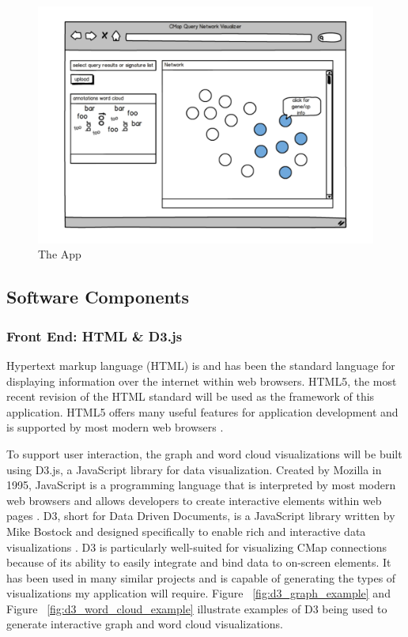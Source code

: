 \documentclass[12pt]{article}
\begin{document}
\begin{figure}[h]
\centering
\includegraphics[scale=0.5]{img/app_mockup}
\caption{The App}
\label{fig:app_mockup}
\end{figure}


\subsection{Software Components}
\subsubsection{Front End: HTML \& D3.js}

Hypertext markup language (HTML) is and has been the standard language for displaying information over the internet within web browsers. HTML5, the most recent revision of the HTML standard will be used as the framework of this application. HTML5 offers many useful features for application development and is supported by most modern web browsers \cite{w3c_html5}. 

To support user interaction, the graph and word cloud visualizations will be built using D3.js, a JavaScript library for data visualization. Created by Mozilla in 1995, JavaScript is a programming language that is interpreted by most modern web browsers and allows developers to create interactive elements within web pages \cite{mozilla_javascript}. D3, short for Data Driven Documents, is a JavaScript library written by Mike Bostock and designed specifically to enable rich and interactive data visualizations \cite{bostock_d3}. D3 is particularly well-suited for visualizing CMap connections because of its ability to easily integrate and bind data to on-screen elements. It has been used in many similar projects and is capable of generating the types of visualizations my application will require. Figure ~\ref{fig:d3_graph_example} and Figure ~\ref{fig:d3_word_cloud_example} illustrate examples of D3 being used to generate interactive graph and word cloud visualizations.
\end{document}

